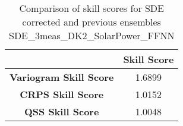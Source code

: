 
        \begin{table}[h!]
            \centering
            \begin{tabular}{|c|c|}
                \hline
                & \textbf{Skill Score}  \\
                \hline
                \textbf{Variogram Skill Score} & 1.6899  \\
                \hline
                \textbf{CRPS Skill Score} & 1.0152  \\
                \hline
                \textbf{QSS Skill Score} & 1.0048 \\
                \hline
            \end{tabular}
            \caption{Comparison of skill scores for SDE corrected and previous ensembles SDE_3meas_DK2_SolarPower_FFNN}
            \label{table:skill_scores_comparison}
        \end{table}
        
